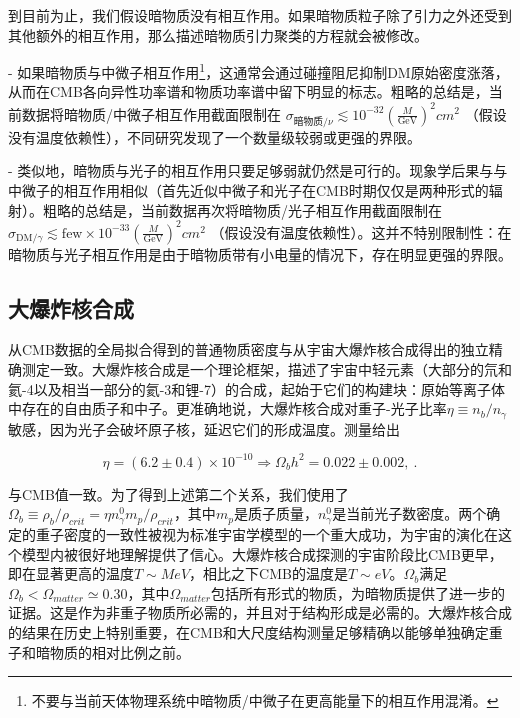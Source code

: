 到目前为止，我们假设暗物质没有相互作用。如果暗物质粒子除了引力之外还受到其他额外的相互作用，那么描述暗物质引力聚类的方程就会被修改。

- 如果暗物质与中微子相互作用\footnote{不要与当前天体物理系统中暗物质/中微子在更高能量下的相互作用混淆。}，这通常会通过碰撞阻尼抑制DM原始密度涨落，从而在CMB各向异性功率谱和物质功率谱中留下明显的标志。粗略的总结是，当前数据将暗物质/中微子相互作用截面限制在 \( \sigma_{\text{暗物质}/\nu} \lesssim 10^{-32} (\frac{M}{\text{GeV}})^2 cm^2\) （假设没有温度依赖性），不同研究发现了一个数量级较弱或更强的界限。

- 类似地，暗物质与光子的相互作用只要足够弱就仍然是可行的。现象学后果与与中微子的相互作用相似（首先近似中微子和光子在CMB时期仅仅是两种形式的辐射）。粗略的总结是，当前数据再次将暗物质/光子相互作用截面限制在 \( \sigma_{\text{DM}/\gamma} \lesssim \text{few} \times 10^{-33} (\frac{M}{\text{GeV}})^2 cm^2\) （假设没有温度依赖性）。这并不特别限制性：在暗物质与光子相互作用是由于暗物质带有小电量的情况下，存在明显更强的界限。

\subsection{大爆炸核合成} 

从CMB数据的全局拟合得到的普通物质密度与从宇宙大爆炸核合成得出的独立精确测定一致。大爆炸核合成是一个理论框架，描述了宇宙中轻元素（大部分的氘和氦-4以及相当一部分的氦-3和锂-7）的合成，起始于它们的构建块：原始等离子体中存在的自由质子和中子。更准确地说，大爆炸核合成对重子-光子比率$\eta \equiv  n_b/n_\gamma$敏感，因为光子会破坏原子核，延迟它们的形成温度。测量给出

\[ \eta = (6.2 \pm 0.4) \times 10^{-10} \Rightarrow \Omega_b h^2 = 0.022 \pm 0.002,~. \]

与CMB值一致。为了得到上述第二个关系，我们使用了$ \Omega_b \equiv  \rho_b/\rho_{crit} = \eta n^0_\gamma m_p/\rho_{crit}$，其中$m_p$是质子质量，$n^0_\gamma$是当前光子数密度。两个确定的重子密度的一致性被视为标准宇宙学模型的一个重大成功，为宇宙的演化在这个模型内被很好地理解提供了信心。大爆炸核合成探测的宇宙阶段比CMB更早，即在显著更高的温度$T \sim MeV$，相比之下CMB的温度是$T \sim eV$。$\Omega_b$满足$\Omega_b < \Omega_{matter} \simeq 0.30$，其中$\Omega_{matter}$包括所有形式的物质，为暗物质提供了进一步的证据。这是作为非重子物质所必需的，并且对于结构形成是必需的。大爆炸核合成的结果在历史上特别重要，在CMB和大尺度结构测量足够精确以能够单独确定重子和暗物质的相对比例之前。






